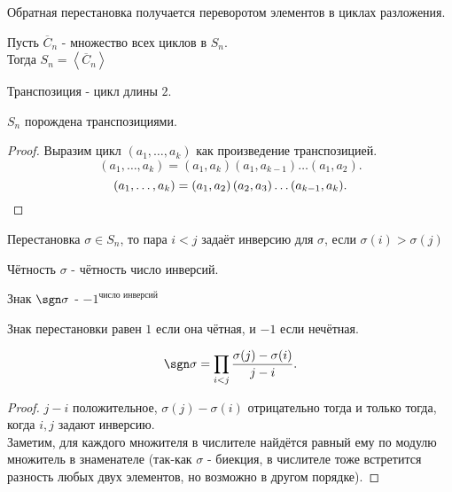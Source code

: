 \documentclass[11pt, oneside]{article}   	%
\begin{document}
    \begin{theorem}
        Обратная перестановка получается переворотом элементов в циклах разложения.
    \end{theorem}
    \begin{theorem}
        Пусть $\overline{C}_n$ - множество всех циклов в $S_n$.\\
        Тогда $S_n = \left<\overline{C}_n\right>$
    \end{theorem}
    \begin{definition}
        Транспозиция - цикл длины $2$.
    \end{definition}
    \begin{theorem}
        $S_n$  порождена транспозициями.\\
        \begin{proof}
            Выразим цикл $\left( a_1, \ldots, a_k \right) $ как произведение транспозицией.\\
            \[ (a_1, \ldots, a_k) = (a_1, a_k)(a_1, a_{k-1})\ldots\left( a_1, a_2 \right)  .\]
            \[ \left( a_1, \ldots, a_k \right) = \left( a_1, a_2 \right) \left( a_2, a_3 \right) \ldots (a_{k-1}, a_k) .\qedhere\] 
        \end{proof}
    \end{theorem}
    \begin{definition}
        Перестановка $\sigma\in S_n$, то пара $i<j$ задаёт инверсию для $\sigma$, если $\sigma(i)>\sigma(j)$
    \end{definition}
    \begin{definition}
        Чётность $\sigma$ - чётность число инверсий.
    \end{definition}
    \begin{definition}
        Знак $\sgn \sigma$ - $-1^{\text{число инверсий}}$
    \end{definition}
    \begin{dlemma}
        Знак перестановки равен $1$ если она чётная, и $-1$ если нечётная.
    \end{dlemma}
    \begin{dlemma}
        \[ \sgn \sigma = \prod\limits_{i<j} \frac{\sigma(j)-\sigma(i)}{j-i}  .\]
        \begin{proof}
            $j-i$ положительное, $\sigma(j)-\sigma(i)$ отрицательно тогда и только тогда, когда $i,j$ задают инверсию.\\
            Заметим, для каждого множителя в числителе найдётся равный ему по модулю множитель в знаменателе (так-как $\sigma$ - биекция, в числителе тоже встретится разность любых двух элементов, но возможно в другом порядке).
        \end{proof}
    \end{dlemma}
\end{document}
